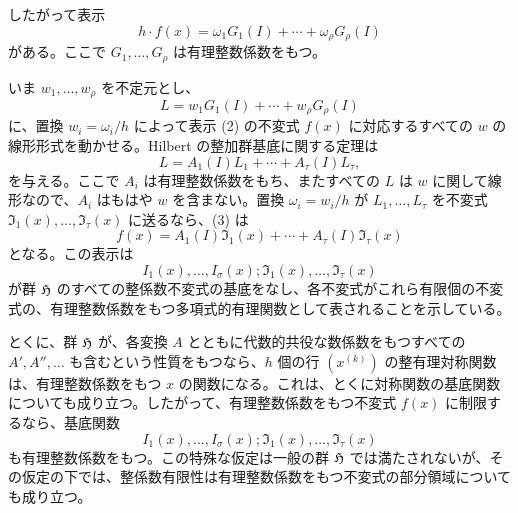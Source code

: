 したがって表示
\begin{equation}
        h\cdot f(x)=\omega_1G_1(I)+\cdots+\omega_\rho G_\rho(I)
\end{equation}
がある。ここで \(G_1,\ldots,G_\rho\) は有理整数係数をもつ。

いま \(w_1,\ldots,w_\rho\) を不定元とし、
\[
        L=w_1G_1(I)+\cdots+w_\rho G_\rho(I)
\]
に、置換 \(w_i=\omega_i/h\) によって表示 (2) の不変式 \(f(x)\) に対応するすべての \(w\) の線形形式を動かせる。Hilbert の整加群基底に関する定理は
\begin{equation}
        L=A_1(I)L_1+\cdots+A_\tau(I)L_\tau,
\end{equation}
を与える。ここで \(A_i\) は有理整数係数をもち、またすべての \(L\) は \(w\) に関して線形なので、\(A_i\) はもはや \(w\) を含まない。置換 \(\omega_i=w_i/h\) が \(L_1,\ldots,L_\tau\) を不変式 \(\mathfrak I_1(x),\ldots,\mathfrak I_\tau(x)\) に送るなら、(3) は
\begin{equation}
        f(x)=A_1(I)\mathfrak I_1(x)+\cdots+A_\tau(I)\mathfrak I_\tau(x)
\end{equation}
となる。この表示は
\[
        I_1(x),\ldots,I_\sigma(x);\mathfrak I_1(x),\ldots,\mathfrak I_\tau(x)
\]
が群 \(\mathfrak H\) のすべての整係数不変式の基底をなし、各不変式がこれら有限個の不変式の、有理整数係数をもつ多項式的有理関数として表されることを示している。

とくに、群 \(\mathfrak H\) が、各変換 \(A\) とともに代数的共役な数係数をもつすべての \(A',A'',\ldots\) も含むという性質をもつなら、\(h\) 個の行 \((x^{(k)})\) の整有理対称関数は、有理整数係数をもつ \(x\) の関数になる。これは、とくに対称関数の基底関数についても成り立つ。したがって、有理整数係数をもつ不変式 \(f(x)\) に制限するなら、基底関数
\[
        I_1(x),\ldots,I_\sigma(x);\mathfrak I_1(x),\ldots,\mathfrak I_\tau(x)
\]
も有理整数係数をもつ。この特殊な仮定は一般の群 \(\mathfrak H\) では満たされないが、その仮定の下では、整係数有限性は有理整数係数をもつ不変式の部分領域についても成り立つ。
